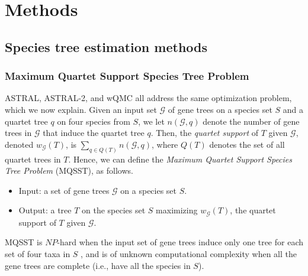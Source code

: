 


\section{Methods }

\subsection{Species tree estimation methods}
\subsubsection{Maximum Quartet Support Species Tree Problem}

ASTRAL, ASTRAL-2,  and wQMC all address the same optimization problem, 
which we now explain.  Given an input set $\mathcal{G}$ of gene 
trees on a species set $S$ and a quartet tree $q$ on four species from  $S$, 
we let $n(\mathcal{G},q)$ denote the number of gene trees in $\mathcal{G}$ that
induce the quartet tree $q$. Then, the 
\emph{quartet support} of $T$ given $\mathcal{G}$, denoted $w_{\mathcal{G}}(T)$, is 
$\sum_{q \in Q(T)} n(\mathcal{G},q)$, where $Q(T)$ denotes the set of all quartet
trees in $T$.
Hence, we can define the {\em Maximum Quartet Support
Species Tree Problem} (MQSST),  as follows. 


\begin{itemize} 

\item Input: a set of gene trees $\mathcal{G}$ on a species set $S$. 

\item Output: a tree $T$  on the species set $S$ maximizing 
$w_{\mathcal{G}}(T)$, 
the quartet support of $T$ given $\mathcal{G}$.

\end{itemize}
\noindent
MQSST is $NP$-hard when the input 
 set of gene trees induce only one tree for each set of four taxa in $S$ 
 \cite{JiangPTAS}, and is of unknown
computational complexity when all the gene trees are complete
(i.e., have all the species in $S$).

